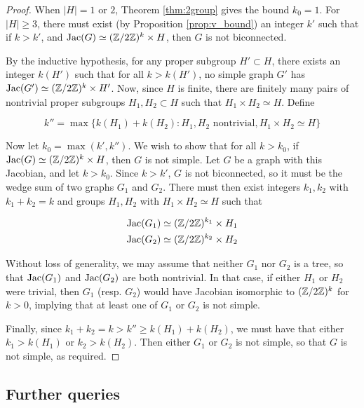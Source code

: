 \documentclass{amsart}
\begin{document}
\begin{proof}
  When $|H| = 1$ or $2$, Theorem \ref{thm:2group} gives the bound $k_0
  = 1$. For $|H| \ge 3$, there must exist (by Proposition
  \ref{prop:v_bound}) an integer $k'$ such that if $k > k'$, and
  $\operatorname{Jac}(G) \simeq (\mathbb{Z}/2\mathbb{Z})^k \times H$, then $G$ is not biconnected.

  By the inductive hypothesis, for any proper subgroup $H' \subset H$,
  there exists an integer $k(H')$ such that for all $k > k(H')$, no
  simple graph $G'$ has $\operatorname{Jac}(G') \simeq (\mathbb{Z}/2\mathbb{Z})^k \times H'$. Now,
  since $H$ is finite, there are finitely many pairs of nontrivial
  proper subgroups $H_1, H_2 \subset H$ such that $H_1 \times H_2
  \simeq H$. Define

\begin{equation*}
  k'' = \max\{k(H_1) + k(H_2) : H_1, H_2 \textrm{ nontrivial}, H_1
  \times H_2 \simeq H\}
\end{equation*}

Now let $k_0 = \max(k', k'')$. We wish to show that for all $k > k_0$,
if $\operatorname{Jac}(G) \simeq (\mathbb{Z}/2\mathbb{Z})^k \times H$, then $G$ is not simple. Let
$G$ be a graph with this Jacobian, and let $k > k_0$.  Since $k > k'$,
$G$ is not biconnected, so it must be the wedge sum of two graphs
$G_1$ and $G_2$. There must then exist integers $k_1, k_2$ with $k_1 +
k_2 = k$ and groups $H_1, H_2$ with $H_1 \times H_2 \simeq H$ such
that

\begin{align}
  \operatorname{Jac}(G_1) &\simeq (\mathbb{Z}/2\mathbb{Z})^{k_1} \times H_1 \\
  \operatorname{Jac}(G_2) &\simeq (\mathbb{Z}/2\mathbb{Z})^{k_2} \times H_2
\end{align}

Without loss of generality, we may assume that neither $G_1$ nor $G_2$
is a tree, so that $\operatorname{Jac}(G_1)$ and $\operatorname{Jac}(G_2)$ are both nontrivial. In
that case, if either $H_1$ or $H_2$ were trivial, then $G_1$
(resp. $G_2$) would have Jacobian isomorphic to $(\mathbb{Z}/2\mathbb{Z})^k$ for $k >
0$, implying that at least one of $G_1$ or $G_2$ is not simple.

Finally, since $k_1 + k_2 = k > k'' \ge k(H_1) + k(H_2)$, we must have
that either $k_1 > k(H_1)$ or $k_2 > k(H_2)$. Then either $G_1$ or
$G_2$ is not simple, so that $G$ is not simple, as required.
\end{proof}

\subsection{Further queries} 
\end{document}
